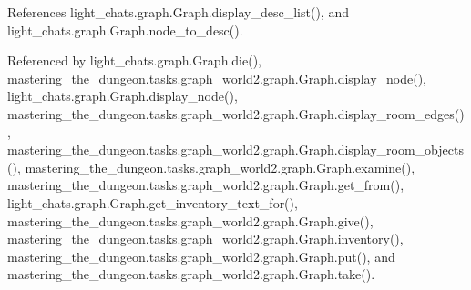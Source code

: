 References light\+\_\+chats.\+graph.\+Graph.\+display\+\_\+desc\+\_\+list(), and light\+\_\+chats.\+graph.\+Graph.\+node\+\_\+to\+\_\+desc().



Referenced by light\+\_\+chats.\+graph.\+Graph.\+die(), mastering\+\_\+the\+\_\+dungeon.\+tasks.\+graph\+\_\+world2.\+graph.\+Graph.\+display\+\_\+node(), light\+\_\+chats.\+graph.\+Graph.\+display\+\_\+node(), mastering\+\_\+the\+\_\+dungeon.\+tasks.\+graph\+\_\+world2.\+graph.\+Graph.\+display\+\_\+room\+\_\+edges(), mastering\+\_\+the\+\_\+dungeon.\+tasks.\+graph\+\_\+world2.\+graph.\+Graph.\+display\+\_\+room\+\_\+objects(), mastering\+\_\+the\+\_\+dungeon.\+tasks.\+graph\+\_\+world2.\+graph.\+Graph.\+examine(), mastering\+\_\+the\+\_\+dungeon.\+tasks.\+graph\+\_\+world2.\+graph.\+Graph.\+get\+\_\+from(), light\+\_\+chats.\+graph.\+Graph.\+get\+\_\+inventory\+\_\+text\+\_\+for(), mastering\+\_\+the\+\_\+dungeon.\+tasks.\+graph\+\_\+world2.\+graph.\+Graph.\+give(), mastering\+\_\+the\+\_\+dungeon.\+tasks.\+graph\+\_\+world2.\+graph.\+Graph.\+inventory(), mastering\+\_\+the\+\_\+dungeon.\+tasks.\+graph\+\_\+world2.\+graph.\+Graph.\+put(), and mastering\+\_\+the\+\_\+dungeon.\+tasks.\+graph\+\_\+world2.\+graph.\+Graph.\+take().

